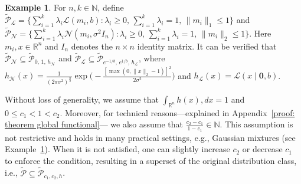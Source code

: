 \documentclass[accepted]{article}
\theoremstyle{plain} %
\theoremstyle{definition}
\newtheorem{example}[theorem]{Example}
\theoremstyle{remark}
\begin{document}
\begin{example}\label{example: Gaussian Laplace universe}
    For $n,k \in \mathbb{N}$,
define $\tilde{\mathcal{P}}_{\mathcal{L}}  = \Big\{ \sum_{i=1}^k \lambda_i \mathcal{L}( m_i, b) :  \lambda_i \geq 0, \, \sum_{i=1}^k \lambda_i = 1, \, \|m_i\|_1 \leq 1 \Big\}$ and $\tilde{\mathcal{P}}_{\mathcal{N}}  = \Big\{ \sum_{i=1}^k \lambda_i \mathcal{N}(m_i, \sigma^2 I_n)  :  \lambda_i \geq 0, \, \sum_{i=1}^k \lambda_i = 1, \, \|m_i\|_2 \leq 1 \Big\}$. Here $m_i, x \in \mathbb{R}^n$ and $I_n$ denotes the $n \times n$ identity matrix.  It can be verified that $\tilde{\mathcal{P}}_{\mathcal{N}} \subseteq \tilde{\mathcal{P}}_{0,\, 1,\, h_{\mathcal{N}}}$ and  $\tilde{\mathcal{P}}_{\mathcal{L}} \subseteq \tilde{\mathcal{P}}_{e^{-1/b},\, e^{1/b},\, h_{\mathcal{L}}}$, where $h_{\mathcal{N}}(x) = \frac{1}{(2\pi \sigma^2)^\frac{n}{2}} \exp\big(-\frac{[\max(0, \|x\|_2 - 1)]^2}{2\sigma^2} \big)$ and  $h_{\mathcal{L}}(x) = \mathcal{L}(x \mid \mathbf{0}, b)$. 
\end{example}
Without loss of generality, we assume that $\int_{\mathbb{R}^n} h(x),dx = 1$ and $0 \leq c_1 < 1 < c_2$. Moreover, for technical reasons---explained in Appendix~\ref{proof: theorem global functional}--- we also assume that \( \frac{c_2 - c_1}{1 - c_1} \in \mathbb{N} \). This assumption is not restrictive and holds in many practical settings, e.g., Gaussian mixtures (see Example~\ref{example: Gaussian Laplace universe}). When it is not satisfied, one can slightly increase \( c_2 \) or decrease \( c_1 \) to enforce the condition, resulting in a superset of the original distribution class, i.e., \( \tilde{\mathcal{P}} \subseteq \tilde{\mathcal{P}}_{c_1, c_2, h} \). 
\end{document}
